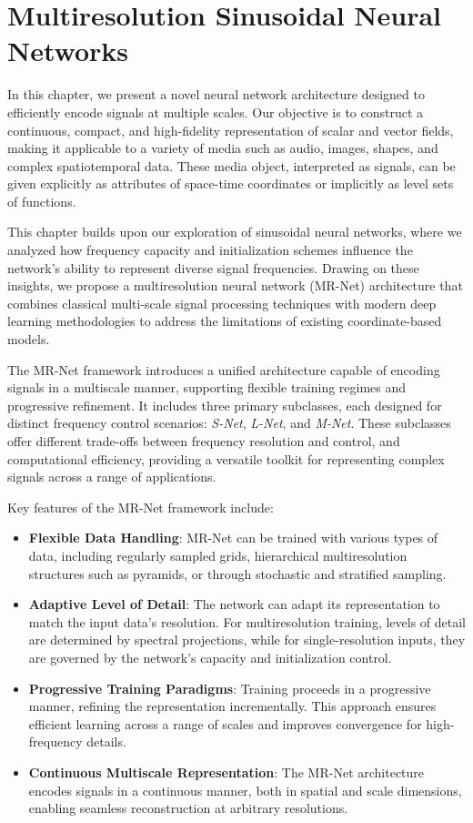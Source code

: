 \chapter{Multiresolution Sinusoidal Neural Networks}
\label{chap:mr_snn}

In this chapter, we present a novel neural network architecture designed to efficiently encode signals at multiple scales. Our objective is to construct a continuous, compact, and high-fidelity representation of scalar and vector fields, making it applicable to a variety of media such as audio, images, shapes, and complex spatiotemporal data. These media object, interpreted as signals, can be given explicitly as attributes of space-time coordinates or implicitly as level sets of functions.

This chapter builds upon our exploration of sinusoidal neural networks, where we analyzed how frequency capacity and initialization schemes influence the network's ability to represent diverse signal frequencies. Drawing on these insights, we propose a multiresolution neural network (MR-Net) architecture that combines classical multi-scale signal processing techniques with modern deep learning methodologies to address the limitations of existing coordinate-based models.

The MR-Net framework introduces a unified architecture capable of encoding signals in a multiscale manner, supporting flexible training regimes and progressive refinement. It includes three primary subclasses, each designed for distinct frequency control scenarios: \emph{S-Net}, \emph{L-Net}, and \emph{M-Net}. These subclasses offer different trade-offs between frequency resolution and control, and computational efficiency, providing a versatile toolkit for representing complex signals across a range of applications.

Key features of the MR-Net framework include:

\begin{itemize}
    \item \textbf{Flexible Data Handling}: MR-Net can be trained with various types of data, including regularly sampled grids, hierarchical multiresolution structures such as pyramids, or through stochastic and stratified sampling.
    \item \textbf{Adaptive Level of Detail}: The network can adapt its representation to match the input data's resolution. For multiresolution training, levels of detail are determined by spectral projections, while for single-resolution inputs, they are governed by the network's capacity and initialization control.
    \item \textbf{Progressive Training Paradigms}: Training proceeds in a progressive manner, refining the representation incrementally. This approach ensures efficient learning across a range of scales and improves convergence for high-frequency details.
    \item \textbf{Continuous Multiscale Representation}: The MR-Net architecture encodes signals in a continuous manner, both in spatial and scale dimensions, enabling seamless reconstruction at arbitrary resolutions.
\end{itemize}

